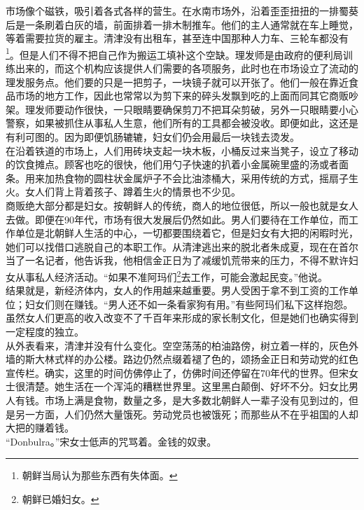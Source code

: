 市场像个磁铁，吸引着各式各样的营生。在水南市场外，沿着歪歪扭扭的一排蜀葵后是一条刷着白灰的墙，前面排着一排木制推车。他们的主人通常就在车上睡觉，等着需要拉货的雇主。清津没有出租车，甚至连中国那种人力车、三轮车都没有\footnote{朝鲜当局认为那些东西有失体面。}。但是人们不得不把自己作为搬运工填补这个空缺。理发师是由政府的便利局训练出来的，而这个机构应该提供人们需要的各项服务，此时也在市场设立了流动的理发服务点。他们要的只是一把剪子，一块镜子就可以开张了。他们一般在靠近食品市场的地方工作，因此也常常以为剪下来的碎头发飘到吃的上面而同其它商贩吵架。理发师要动作很快，一只眼睛要确保剪刀不把耳朵剪破，另外一只眼睛要小心警察，如果被抓住从事私人生意，他们所有的工具都会被没收。即便如此，这还是有利可图的。因为即便饥肠辘辘，妇女们仍会用最后一块钱去烫发。\\

在沿着铁道的市场上，人们用砖块支起一块木板，小桶反过来当凳子，设立了移动的饮食摊点。顾客也吃的很快，他们用勺子快速的扒着小金属碗里盛的汤或者面条。用来加热食物的圆柱状金属炉子不会比油漆桶大，采用传统的方式，摇扇子生火。女人们背上背着孩子、蹲着生火的情景也不少见。\\

商贩绝大部分都是妇女。按朝鲜人的传统，商人的地位很低，所以一般也就是女人去做。即便在90年代，市场有很大发展后仍然如此。男人们要待在工作单位，而工作单位是北朝鲜人生活的中心，一切都要围绕着它，但是妇女有大把的闲暇时光，她们可以找借口逃脱自己的本职工作。从清津逃出来的脱北者朱成夏，现在在首尔当了一名记者，他告诉我，他相信金正日为了减缓饥荒带来的压力，不得不默许妇女从事私人经济活动。“如果不准阿玛们\footnote{朝鲜已婚妇女。}去工作，可能会激起民变。”他说。\\

结果就是，新经济体内，女人的作用越来越重要。男人受困于拿不到工资的工作单位；妇女们则在赚钱。“男人还不如一条看家狗有用。”有些阿玛们私下这样抱怨。虽然女人们更高的收入改变不了千百年来形成的家长制文化，但是她们也确实得到一定程度的独立。\\

从外表看来，清津并没有什么变化。空空荡荡的柏油路傍，树立着一样的，灰色外墙的斯大林式样的办公楼。路边仍然点缀着褪了色的，颂扬金正日和劳动党的红色宣传栏。确实，这里的时间仿佛停止了，仿佛时间还停留在70年代的世界。但宋女士很清楚。她生活在一个浑沌的糟糕世界里。这里黑白颠倒、好坏不分。妇女比男人有钱。市场上满是食物，数量之多，是大多数北朝鲜人一辈子没有见到过的，但是另一方面，人们仍然大量饿死。劳动党员也被饿死；而那些从不在乎祖国的人却大把的赚着钱。\\

“Donbulra。”宋女士低声的咒骂着。金钱的奴隶。\\

